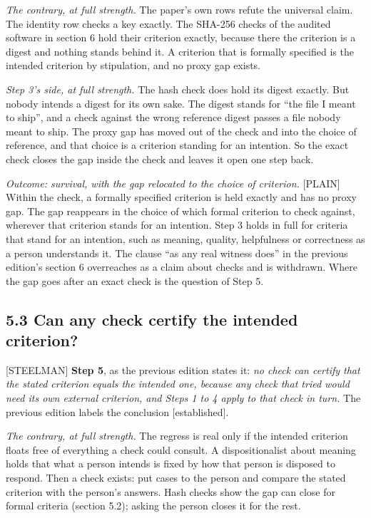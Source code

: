 \documentclass[11pt]{article}
\newcommand{\register}[1]{{\ttfamily\small #1}}
\begin{document}
\emph{The contrary, at full strength.} The paper's own rows refute the universal claim. The identity row checks a key exactly. The SHA-256 checks of the audited software in section 6 hold their criterion exactly, because there the criterion is a digest and nothing stands behind it. A criterion that is formally specified is the intended criterion by stipulation, and no proxy gap exists.

\emph{Step 3's side, at full strength.} The hash check does hold its digest exactly. But nobody intends a digest for its own sake. The digest stands for ``the file I meant to ship'', and a check against the wrong reference digest passes a file nobody meant to ship. The proxy gap has moved out of the check and into the choice of reference, and that choice is a criterion standing for an intention. So the exact check closes the gap inside the check and leaves it open one step back.

\emph{Outcome: survival, with the gap relocated to the choice of criterion.} \register{[PLAIN]} Within the check, a formally specified criterion is held exactly and has no proxy gap. The gap reappears in the choice of which formal criterion to check against, wherever that criterion stands for an intention. Step 3 holds in full for criteria that stand for an intention, such as meaning, quality, helpfulness or correctness as a person understands it. The clause ``as any real witness does'' in the previous edition's section 6 overreaches as a claim about checks and is withdrawn. Where the gap goes after an exact check is the question of Step 5.

\subsection*{5.3 Can any check certify the intended criterion?}

\register{[STEELMAN]} \textbf{Step 5}, as the previous edition states it: \emph{no check can certify that the stated criterion equals the intended one, because any check that tried would need its own external criterion, and Steps 1 to 4 apply to that check in turn.} The previous edition labels the conclusion [established].

\emph{The contrary, at full strength.} The regress is real only if the intended criterion floats free of everything a check could consult. A dispositionalist about meaning holds that what a person intends is fixed by how that person is disposed to respond. Then a check exists: put cases to the person and compare the stated criterion with the person's answers. Hash checks show the gap can close for formal criteria (section 5.2); asking the person closes it for the rest.
\end{document}
